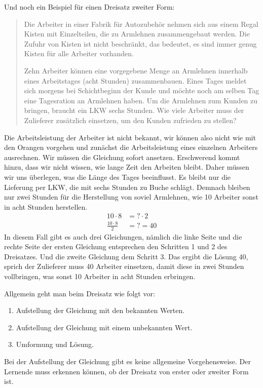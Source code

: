 Und noch ein Beispiel für einen Dreisatz zweiter Form:
\begin{quote}
Die Arbeiter in einer Fabrik für Autozubehör nehmen sich aus einem Regal Kisten mit Einzelteilen, die zu Armlehnen zusammengebaut werden. Die Zufuhr von Kisten ist nicht beschränkt, das bedeutet, es sind immer genug Kisten für alle Arbeiter vorhanden. 

Zehn Arbeiter können eine vorgegebene Menge an Armlehnen innerhalb eines Arbeitstages (acht Stunden) zusammenbauen. Eines Tages meldet sich morgens bei Schichtbeginn der Kunde und möchte noch am selben Tag eine Tagesration an Armlehnen haben. Um die Armlehnen zum Kunden zu bringen, braucht ein LKW sechs Stunden. Wie viele Arbeiter muss der Zulieferer zusätzlich einsetzen, um den Kunden zufrieden zu stellen?
\end{quote}
Die Arbeitsleistung der Arbeiter ist nicht bekannt, wir können also nicht wie mit den Orangen vorgehen und zunächst die Arbeitsleistung eines einzelnen Arbeiters ausrechnen. Wir müssen die Gleichung sofort ansetzen. Erschwerend kommt hinzu, dass wir nicht wissen, wie lange Zeit den Arbeiten bleibt. Daher müssen wir uns überlegen, was die Länge des Tages beeinflusst. Es bleibt nur die Lieferung per LKW, die mit sechs Stunden zu Buche schlägt. Demnach bleiben nur zwei Stunden für die Herstellung von soviel Armlehnen, wie 10 Arbeiter sonst in acht Stunden herstellen.
\begin{equation*}
\begin{split}
10\cdot 8 &= ? \cdot 2 \\
\frac{10\cdot 8}{2} &= ? = 40
\end{split}
\end{equation*}
In diesem Fall gibt es auch drei Gleichungen, nämlich die linke Seite und die rechte Seite der ersten Gleichung entsprechen den Schritten 1 und 2 des Dreisatzes. Und die zweite Gleichung dem Schritt 3. Das ergibt die Lösung 40, sprich der Zulieferer muss 40 Arbeiter einsetzen, damit diese in zwei Stunden vollbringen, was sonst 10 Arbeiter in acht Stunden erbringen.

Allgemein geht man beim Dreisatz wie folgt vor:
\begin{enumerate}
\item Aufstellung der Gleichung mit den bekannten Werten.
\item Aufstellung der Gleichung mit einem unbekannten Wert.
\item Umformung und Lösung.
\end{enumerate}
Bei der Aufstellung der Gleichung gibt es keine allgemeine Vorgehensweise. Der Lernende muss erkennen können, ob der Dreisatz von erster oder zweiter Form ist. 

